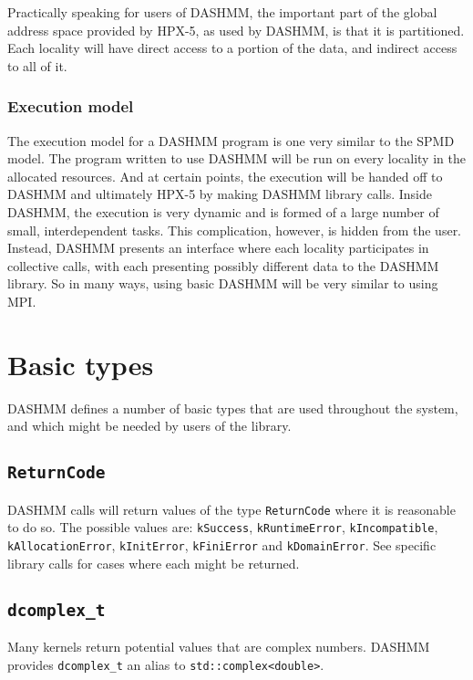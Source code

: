 Practically speaking for users of DASHMM, the important part of the global
address space provided by HPX-5, as used by DASHMM, is that it is partitioned.
Each locality will have direct access to a portion of the data, and
indirect access to all of it.

\subsubsection{Execution model}

The execution model for a DASHMM program is one very similar to the SPMD model.
The program written to use DASHMM will be run on every locality in the allocated
resources. And at certain points, the execution will be handed off to DASHMM and
ultimately HPX-5 by making DASHMM library calls. Inside DASHMM, the execution is
very dynamic and is formed of a large number of small, interdependent tasks.
This complication, however, is hidden from the user. Instead, DASHMM presents
an interface where each locality participates in collective calls, with each
presenting possibly different data to the DASHMM library. So in many ways,
using basic DASHMM will be very similar to using MPI.

\section{Basic types}

DASHMM defines a number of basic types that are used throughout the system,
and which might be needed by users of the library.

\subsection{\texttt{ReturnCode}}

DASHMM calls will return values of the type \texttt{ReturnCode} where it is
reasonable to do so. The possible values are: \texttt{kSuccess}, \texttt{kRuntimeError}, \texttt{kIncompatible},
\texttt{kAllocationError}, \texttt{kInitError}, \texttt{kFiniError} and
\texttt{kDomainError}. See specific
library calls for cases where each might be returned.

\subsection{\texttt{dcomplex\_t}}
Many kernels return potential values that are complex numbers. DASHMM provides
\texttt{dcomplex\_t} an alias to \texttt{std::complex<double>}.

